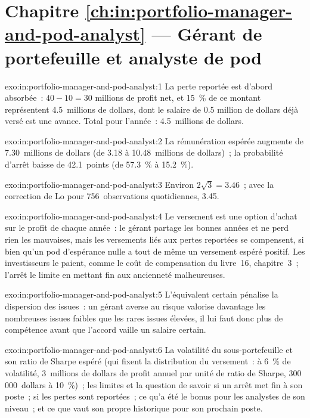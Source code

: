 \section*{Chapitre \ref{ch:in:portfolio-manager-and-pod-analyst} --- Gérant de portefeuille et analyste de pod}

\begin{solution}{exo:in:portfolio-manager-and-pod-analyst:1}
La perte reportée est d'abord absorbée~: $40-10=30$ millions de profit net, et 15~\% de ce montant représentent 4.5~millions de dollars, dont le salaire de 0.5
million de dollars déjà versé est une avance. Total pour l'année~: 4.5~millions de dollars.
\end{solution}

\begin{solution}{exo:in:portfolio-manager-and-pod-analyst:2}
La rémunération espérée augmente de 7.30~millions de dollars (de 3.18 à 10.48~millions de dollars)~; la probabilité d'arrêt baisse de 42.1~points (de 57.3~\% à
15.2~\%).
\end{solution}

\begin{solution}{exo:in:portfolio-manager-and-pod-analyst:3}
Environ $2\sqrt3=3.46$~; avec la correction de Lo pour 756~observations quotidiennes, 3.45.
\end{solution}

\begin{solution}{exo:in:portfolio-manager-and-pod-analyst:4}
Le versement est une option d'achat sur le profit de chaque année~: le gérant partage les bonnes années et ne perd rien les mauvaises, mais les versements
liés aux pertes reportées se compensent, si bien qu'un pod d'espérance nulle a tout de même un versement espéré positif. Les investisseurs le paient, comme
le coût de compensation du livre~16, chapitre~3~; l'arrêt le limite en mettant fin aux ancienneté malheureuses.
\end{solution}

\begin{solution}{exo:in:portfolio-manager-and-pod-analyst:5}
L'équivalent certain pénalise la dispersion des issues~: un gérant averse au risque valorise davantage les nombreuses issues faibles que
les rares issues élevées, il lui faut donc plus de compétence avant que l'accord vaille un salaire certain.
\end{solution}

\begin{solution}{exo:in:portfolio-manager-and-pod-analyst:6}
La volatilité du sous-portefeuille et son ratio de Sharpe espéré (qui fixent la distribution du versement~: à 6~\% de volatilité,
3~millions de dollars de profit annuel par unité de ratio de Sharpe, 300\,000~dollars à 10~\%)~; les limites et la question de savoir si un arrêt met fin à son poste~;
si les pertes sont reportées~; ce qu'a été le bonus pour les analystes de son niveau~; et ce que vaut son propre historique
pour son prochain poste.
\end{solution}

